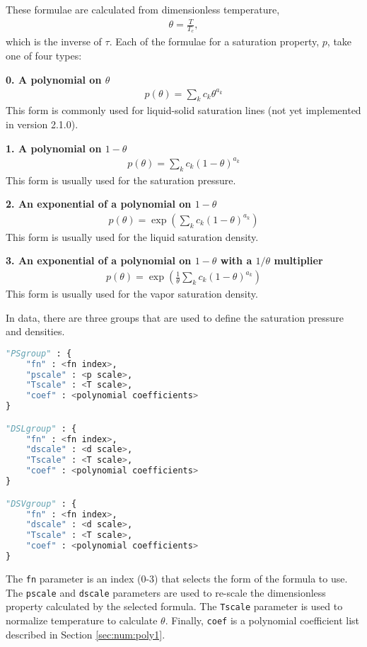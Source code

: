 These formulae are calculated from dimensionless temperature, 
\begin{align}
\theta = \frac{T}{T_c},
\end{align}
which is the inverse of $\tau$.  Each of the formulae for a saturation property, $p$, take one of four types:

{\bf 0. A polynomial on $\theta$} 
\begin{align}
p(\theta) = \sum_k c_k \theta^{a_k}
\end{align}
This form is commonly used for liquid-solid saturation lines (not yet implemented in version 2.1.0).

{\bf 1. A polynomial on $1-\theta$}
\begin{align}
p(\theta) = \sum_k c_k (1-\theta)^{a_k}
\end{align}
This form is usually used for the saturation pressure.

{\bf 2. An exponential of a polynomial on $1-\theta$}
\begin{align}
p(\theta) = \exp \left( \sum_k c_k (1-\theta)^{a_k} \right)
\end{align}
This form is usually used for the liquid saturation density.

{\bf 3. An exponential of a polynomial on $1-\theta$ with a $1/\theta$ multiplier}
\begin{align}
p(\theta) = \exp \left( \frac{1}{\theta} \sum_k c_k (1-\theta)^{a_k} \right)
\end{align}
This form is usually used for the vapor saturation density.

In data, there are three groups that are used to define the saturation pressure and densities.
\begin{lstlisting}[language=Python]
"PSgroup" : {
    "fn" : <fn index>,
    "pscale" : <p scale>,
    "Tscale" : <T scale>,
    "coef" : <polynomial coefficients>
}

"DSLgroup" : {
    "fn" : <fn index>,
    "dscale" : <d scale>,
    "Tscale" : <T scale>,
    "coef" : <polynomial coefficients>
}

"DSVgroup" : {
    "fn" : <fn index>,
    "dscale" : <d scale>,
    "Tscale" : <T scale>,
    "coef" : <polynomial coefficients>
}
\end{lstlisting}

The \texttt{fn} parameter is an index (0-3) that selects the form of the formula to use.  The \texttt{pscale} and \texttt{dscale} parameters are used to re-scale the dimensionless property calculated by the selected formula.  The \texttt{Tscale} parameter is used to normalize temperature to calculate $\theta$.  Finally, \texttt{coef} is a polynomial coefficient list described in Section \ref{sec:num:poly1}.

